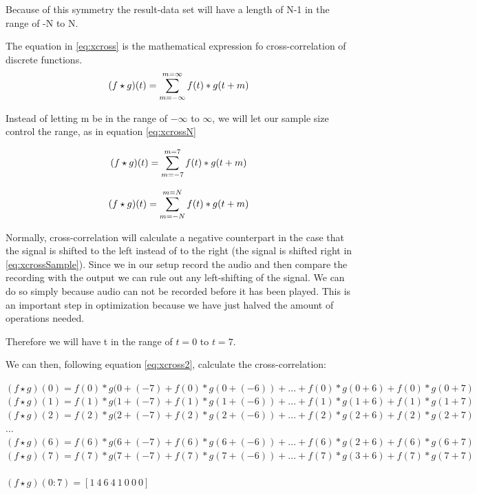 Because of this symmetry the result-data set will have a length of N-1 in the range of -N to N.

The equation in \ref{eq:xcross} is the mathematical expression fo cross-correlation of discrete functions.
\begin{equation}
\label{eq:xcross}
\centering
(f\star g)(t)=\sum\limits_{m=-\infty}^{m=\infty}f(t)*g(t+m)
\end{equation}

Instead of letting m be in the range of $-\infty$ to $\infty$, we will let our sample size control the range, as in equation \ref{eq:xcrossN}

\begin{equation}
\label{eq:xcross2}
\centering
(f\star g)(t)=\sum\limits_{m=-7}^{m=7}f(t)*g(t+m)
\end{equation}

\begin{equation}
\label{eq:xcrossN}
\centering
(f\star g)(t)=\sum\limits_{m=-N}^{m=N}f(t)*g(t+m)
\end{equation}

Normally, cross-correlation will calculate a negative counterpart in the case that the signal is shifted to the left instead of to the right (the signal is shifted right in \ref{eq:xcrossSample}). Since we in our setup record the audio and then compare the recording with the output we can rule out any left-shifting of the signal. We can do so simply because audio can not be recorded before it has been played. This is an important step in optimization because we have just halved  the amount of operations needed.

Therefore we will have t in the range of $t=0$ to $t=7$. 

We can then, following equation \ref{eq:xcross2}, calculate the cross-correlation:

\begin{center}
$(f\star g)(0)=f(0)*g(0+(-7)+f(0)*g(0+(-6))+...+f(0)*g(0+6)+f(0)*g(0+7)$\\
$(f\star g)(1)=f(1)*g(1+(-7)+f(1)*g(1+(-6))+...+f(1)*g(1+6)+f(1)*g(1+7)$\\
$(f\star g)(2)=f(2)*g(2+(-7)+f(2)*g(2+(-6))+...+f(2)*g(2+6)+f(2)*g(2+7)$\\
$...$\\
$(f\star g)(6)=f(6)*g(6+(-7)+f(6)*g(6+(-6))+...+f(6)*g(2+6)+f(6)*g(6+7)$\\
$(f\star g)(7)=f(7)*g(7+(-7)+f(7)*g(7+(-6))+...+f(7)*g(3+6)+f(7)*g(7+7)$\\
\ \\
$(f\star g)(0:7)=[1\ 4\ 6\ 4\ 1\ 0\ 0\ 0]$\\
\end{center}


